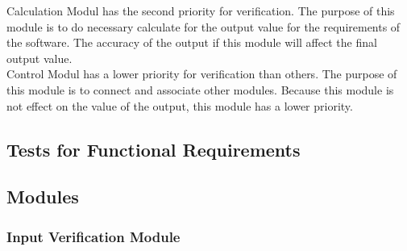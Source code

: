 \documentclass[12pt, titlepage]{article}
\begin{document}
Calculation Modul has the second priority for verification. The purpose of this module is to do necessary calculate for the output value for the requirements of the software. The accuracy of the output if this module will affect the final output value.\\

Control Modul has a lower priority for verification than others. The purpose of this module is to connect and associate other modules. Because this module is not effect on the value of the output, this module has a lower priority.


\subsection{Tests for Functional Requirements}



\subsection{Modules}
\subsubsection{Input Verification Module} 
\end{document}
